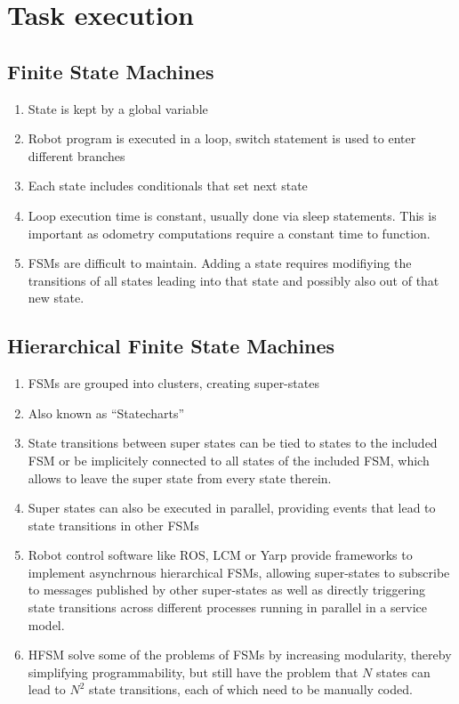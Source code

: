 \chapter{Task execution}

\section{Finite State Machines}

\begin{enumerate}
\item State is kept by a global variable
\item Robot program is executed in a loop, switch statement is used to enter different branches
\item Each state includes conditionals that set next state
\item Loop execution time is constant, usually done via sleep statements. This is important as odometry computations require a constant time to function.
\item FSMs are difficult to maintain. Adding a state requires modifiying the transitions of all states leading into that state and possibly also out of that new state.
\end{enumerate}

\section{Hierarchical Finite State Machines}
\begin{enumerate}
\item FSMs are grouped into clusters, creating super-states
\item Also known as ``Statecharts'' \cite{harel1987statecharts}

\item State transitions between super states can be tied to states to the included FSM or be implicitely connected to all states of the included FSM, which allows to leave the super state from every state therein. 
\item Super states can also be executed in parallel, providing  events that lead to state transitions in other FSMs
\item Robot control software like ROS, LCM or Yarp provide frameworks to implement asynchrnous hierarchical FSMs, allowing super-states to subscribe to messages published by other super-states as well as directly triggering state transitions across different processes running in parallel in a service model.
\item HFSM solve some of the problems of FSMs by increasing modularity, thereby simplifying programmability, but still have the problem that $N$ states can lead to $N^2$ state transitions, each of which need to be manually coded.
\end{enumerate}

